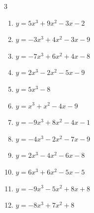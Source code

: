 \begin{multicols}{3}
\begin{enumerate}

  \item $y=5x^{3}+9x^{2}-3x-2$


  \item $y=-3x^{3}+4x^{2}-3x-9$


  \item $y=-7x^{3}+6x^{2}+4x-8$


  \item $y=2x^{3}-2x^{2}-5x-9$


  \item $y=5x^{3}-8$


\columnbreak %

  \item $y=x^{3}+x^{2}-4x-9$


  \item $y=-9x^{3}+8x^{2}-4x-1$


  \item $y=-4x^{3}-2x^{2}-7x-9$


  \item $y=2x^{3}-4x^{2}-6x-8$


  \item $y=6x^{3}+6x^{2}-5x-5$


  \item $y=-9x^{3}-5x^{2}+8x+8$


  \item $y=-8x^{3}+7x^{2}+8$



\end{enumerate}
\end{multicols}
